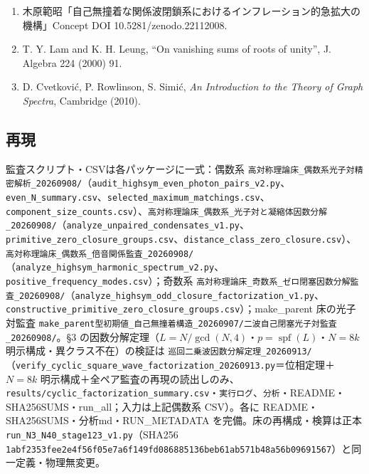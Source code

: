 \documentclass[
  a4paper,
]{ltjsarticle}
\providecommand{\tightlist}{%
  \setlength{\itemsep}{0pt}\setlength{\parskip}{0pt}}
\begin{document}
\begin{enumerate}
\def\labelenumi{\arabic{enumi}.}
\tightlist
\item
  木原範昭「自己無撞着な関係波閉鎖系におけるインフレーション的急拡大の機構」Concept
  DOI 10.5281/zenodo.22112008.
\item
  T. Y. Lam and K. H. Leung, ``On vanishing sums of roots of unity'', J.
  Algebra 224 (2000) 91.
\item
  D. Cvetković, P. Rowlinson, S. Simić, \emph{An Introduction to the
  Theory of Graph Spectra}, Cambridge (2010).
\end{enumerate}

\subsection{再現}\label{ux518dux73fe}

監査スクリプト・CSVは各パッケージに一式：偶数系
\texttt{高対称理論床\_偶数系光子対精密解析\_20260908/}（\texttt{audit\_highsym\_even\_photon\_pairs\_v2.py}、\texttt{even\_N\_summary.csv}、\texttt{selected\_maximum\_matchings.csv}、\texttt{component\_size\_counts.csv}）、\texttt{高対称理論床\_偶数系\_光子対と凝縮体因数分解\_20260908/}（\texttt{analyze\_unpaired\_condensates\_v1.py}、\texttt{primitive\_zero\_closure\_groups.csv}、\texttt{distance\_class\_zero\_closure.csv}）、\texttt{高対称理論床\_偶数系\_倍音関係監査\_20260908/}（\texttt{analyze\_highsym\_harmonic\_spectrum\_v2.py}、\texttt{positive\_frequency\_modes.csv}）；奇数系
\texttt{高対称理論床\_奇数系\_ゼロ閉塞因数分解監査\_20260908/}（\texttt{analyze\_highsym\_odd\_closure\_factorization\_v1.py}、\texttt{constructive\_primitive\_zero\_closure\_groups.csv}）；make\_parent
床の光子対監査
\texttt{make\_parent型初期値\_自己無撞着構造\_20260907/二波自己閉塞光子対監査\_20260908/}。§3
の因数分解定理（\(L=N/\gcd(N,4)\)・\(p=\operatorname{spf}(L)\)・\(N=8k\)
明示構成・異クラス不在）の検証は
\texttt{巡回二乗波因数分解定理\_20260913/}（\texttt{verify\_cyclic\_square\_wave\_factorization\_20260913.py}＝位相定理＋\(N=8k\)
明示構成＋全ペア監査の再現の読出しのみ、\texttt{results/cyclic\_factorization\_summary.csv}・\texttt{実行ログ}、\texttt{分析}・README・SHA256SUMS・run\_all；入力は上記偶数系
CSV）。各に README・SHA256SUMS・分析md・RUN\_METADATA
を完備。床の再構成・検算は正本
\texttt{run\_N3\_N40\_stage123\_v1.py}（SHA256
\texttt{1abf2353fee2e4f56f05e7a6f149fd086885136beb61ab571b48a56b09691567}）と同一定義・物理無変更。
\end{document}

